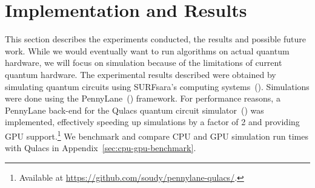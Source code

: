 \documentclass[a4paper,10pt]{article}
\begin{document}
\section{Implementation and Results} \label{sec:implementation-and-results}
This section describes the experiments conducted, the results and possible future work.
While we would eventually want to run algorithms on actual quantum hardware, we will focus on simulation because of the limitations of current quantum hardware.
The experimental results described were obtained by simulating quantum circuits using SURFsara's computing systems~(\cite{surfsara}).
Simulations were done using the PennyLane~(\cite{bergholm2018pennylane}) framework.
For performance reasons, a PennyLane back-end for the Qulacs quantum circuit simulator~(\cite{qulacs}) was implemented, effectively speeding up simulations by a factor of 2 and providing GPU support.\footnote{Available at \url{https://github.com/soudy/pennylane-qulacs/}.}
We benchmark and compare CPU and GPU simulation run times with Qulacs in Appendix~\ref{sec:cpu-gpu-benchmark}.
\end{document}
